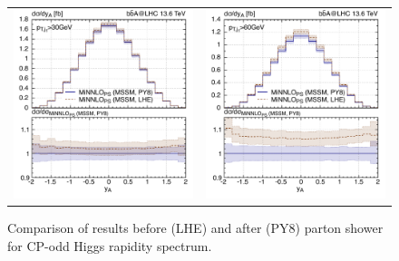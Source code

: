 \documentclass[11pt,a4paper]{article}
\begin{document}
\begin{figure}[t!]
\begin{center}
\begin{tabular}{cc}
\includegraphics[width=.45\textwidth, page=1]{plots/5fs/BSM/y_H-ptj30__A-1400GeV-.pdf}&
\includegraphics[width=.45\textwidth, page=1]{plots/5fs/BSM/y_H-ptj60__A-1400GeV-.pdf}
\end{tabular}
\vspace*{1ex}
\caption{Comparison of \minnlo{} results before (LHE) and after (PY8) parton shower for CP-odd Higgs rapidity spectrum. \label{fig:yA}}
\end{center}
\end{figure}
\end{document}
